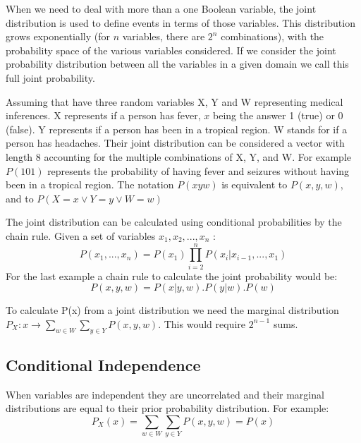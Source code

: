 When we need to deal with more than a one Boolean variable, the joint distribution is used to define events in terms of those variables. 
This distribution grows exponentially (for $n$ variables, there are $2^{n}$ combinations), with the probability space of the various variables considered. If we consider the joint probability distribution between all the variables in a given domain we call this full joint probability.

Assuming that have three random  variables X, Y and W representing medical inferences. X represents if a person has fever, $x$ being the answer 1 (true) or 0 (false). Y represents if a person has been in a tropical region. W stands for if a person has headaches. Their joint distribution can be considered a vector with length 8 accounting for the multiple combinations of X, Y, and W. For example $P(101)$ represents the probability of having fever and seizures without having been in a tropical region. The notation $P(xyw)$ is equivalent to $P(x,y,w)$, and to $P(X=x \vee Y=y \vee W=w)$

The joint distribution can be calculated using conditional probabilities by the chain rule\cite{Norvig2003}. Given a set of variables $x_{1},x_{2},..., x_{n}$ :
\begin{equation}
P(x_{1}, ..., x_{n})=P(x_{1}) \prod_{i=2}^{n}P(x_{i}\vert x_{i - 1}, ... , x_{1})
\end{equation}
For the last example a chain rule to calculate the joint probability would be:
\begin{equation}
\label{eq_chain_rule_example}
P(x,y,w)= P(x \vert y, w) . P(y \vert w) . P(w)  
\end{equation}

To calculate P(x) from a joint distribution we need the marginal distribution $P_{X} : x \rightarrow \sum_{w \in W} \sum_{y \in Y}P(x , y, w)$. This would require $2^{n-1}$ sums. 


\subsection{Conditional Independence}

When variables are independent they are uncorrelated and their marginal distributions are equal to their prior probability distribution\cite{Pearl2000}. For example: 
\begin{equation}
 P_{X}(x) = \sum_{w \in W} \sum_{y \in Y}P(x , y, w) = P(x) 
\end{equation}

